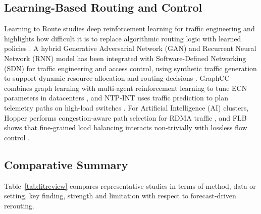 \documentclass[conference]{IEEEtran}
\begin{document}
\subsection{Learning-Based Routing and Control}
Learning to Route studies deep reinforcement learning for traffic engineering and highlights how difficult it is to replace algorithmic routing logic with learned policies \cite{valadarsky2017learning}. A hybrid Generative Adversarial Network (GAN) and Recurrent Neural Network (RNN) model has been integrated with Software-Defined Networking (SDN) for traffic engineering and access control, using synthetic traffic generation to support dynamic resource allocation and routing decisions \cite{khekare2023ganrnn}. GraphCC combines graph learning with multi-agent reinforcement learning to tune ECN parameters in datacenters \cite{bernardez2025graphcc}, and NTP-INT uses traffic prediction to plan telemetry paths on high-load switches \cite{zhang2025ntpint}. For Artificial Intelligence (AI) clusters, Hopper performs congestion-aware path selection for RDMA traffic \cite{nosrati2025hopper}, and FLB shows that fine-grained load balancing interacts non-trivially with lossless flow control \cite{hu2025flb}.

\subsection{Comparative Summary}
Table~\ref{tab:litreview} compares representative studies in terms of method, data or setting, key finding, strength and limitation with respect to forecast-driven rerouting.
\end{document}
